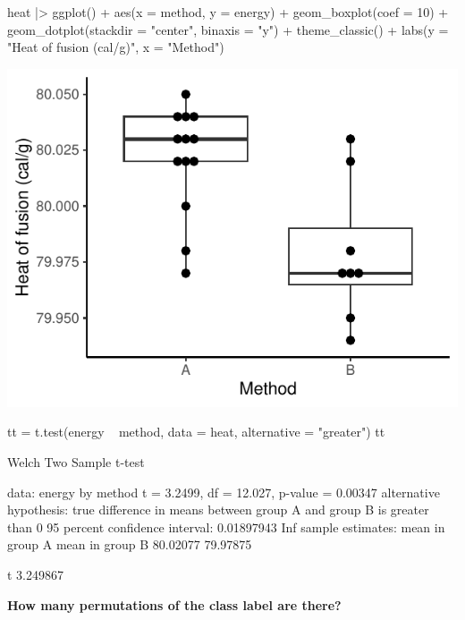 \documentclass[a4paper]{article}\usepackage[]{graphicx}\usepackage[]{xcolor}
\makeatletter
\def\maxwidth{ %
  \ifdim\Gin@nat@width>\linewidth
    \linewidth
  \else
    \Gin@nat@width
  \fi
}
\makeatother
\begin{document}
\begin{Schunk}
\begin{Sinput}
heat |> ggplot() + 
  aes(x = method, y = energy) + 
  geom_boxplot(coef = 10) + 
  geom_dotplot(stackdir = "center", binaxis = "y") +
  theme_classic() +
  labs(y = "Heat of fusion (cal/g)", x = "Method")
\end{Sinput}


{\centering \includegraphics[width=\maxwidth]{figure/listings-unnamed-chunk-148-1} 

}

\begin{Sinput}
tt = t.test(energy ~ method, data = heat, alternative = "greater")
tt
\end{Sinput}
\begin{Soutput}

	Welch Two Sample t-test

data:  energy by method
t = 3.2499, df = 12.027, p-value = 0.00347
alternative hypothesis: true difference in means between group A and group B is greater than 0
95 percent confidence interval:
 0.01897943        Inf
sample estimates:
mean in group A mean in group B 
       80.02077        79.97875 
\end{Soutput}
\begin{Soutput}
       t 
3.249867 
\end{Soutput}
\end{Schunk}
\begin{greenbox}
	\textbf{How many permutations of the class label are there?}
\end{greenbox}
\end{document}
